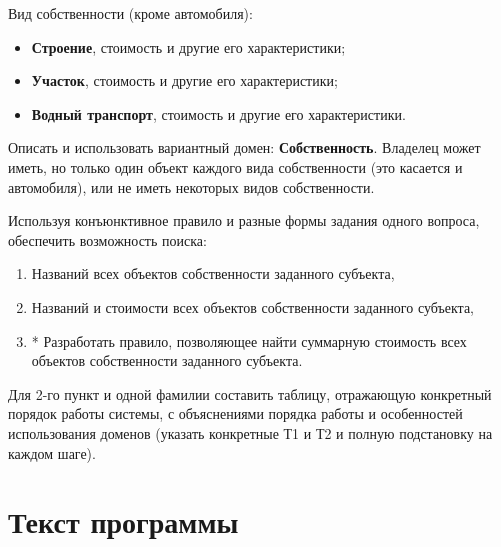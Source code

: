 Вид собственности (кроме автомобиля):

\begin{itemize}[$\bullet$]
	\item \textbf{Строение}, стоимость и другие его характеристики;
	\item \textbf{Участок}, стоимость и другие его характеристики;
	\item \textbf{Водный транспорт}, стоимость и другие его характеристики.
\end{itemize}

Описать и использовать вариантный домен: \textbf{Собственность}. Владелец может иметь, но только один объект каждого вида собственности (это касается и автомобиля), или не иметь некоторых видов собственности.

Используя конъюнктивное правило и разные формы задания одного вопроса, обеспечить возможность поиска:

\begin{enumerate}[1.]
	\item Названий всех объектов собственности заданного субъекта,
	\item Названий и стоимости всех объектов собственности заданного субъекта,
	\item * Разработать правило, позволяющее найти суммарную стоимость всех объектов собственности заданного субъекта.
\end{enumerate}

Для 2-го пункт и одной фамилии составить таблицу, отражающую конкретный порядок работы системы, с объяснениями порядка работы и особенностей использования доменов (указать конкретные Т1 и Т2 и полную подстановку на каждом шаге).

\clearpage

{\large\section*{Текст программы}}

